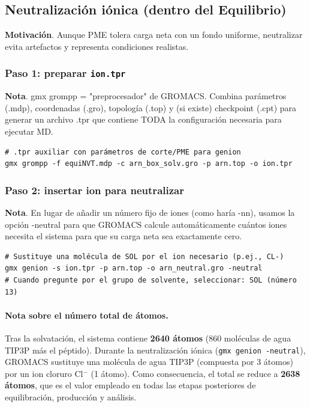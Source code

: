 \documentclass[12pt,a4paper]{article}
\begin{document}
\subsection{Neutralización iónica (dentro del Equilibrio)}
\textbf{Motivación}. Aunque PME tolera carga neta con un fondo uniforme, neutralizar evita artefactos y representa condiciones realistas.

\subsubsection*{Paso 1: preparar \texttt{ion.tpr}}

\noindent\textbf{Nota}. gmx grompp = "preprocesador" de GROMACS. Combina parámetros (.mdp), coordenadas (.gro), topología (.top) y (si existe) checkpoint (.cpt) para generar un archivo .tpr que contiene TODA la configuración necesaria para ejecutar MD.

\begin{lstlisting}[style=bashstyle]
# .tpr auxiliar con parámetros de corte/PME para genion
gmx grompp -f equiNVT.mdp -c arn_box_solv.gro -p arn.top -o ion.tpr
\end{lstlisting}

\subsubsection*{Paso 2: insertar ion para neutralizar}

\noindent\textbf{Nota}. En lugar de añadir un número fijo de iones (como haría -nn), usamos la opción -neutral para que GROMACS calcule automáticamente cuántos iones necesita el sistema para que su carga neta sea exactamente cero.

\begin{lstlisting}[style=bashstyle]
# Sustituye una molécula de SOL por el ion necesario (p.ej., CL-)
gmx genion -s ion.tpr -p arn.top -o arn_neutral.gro -neutral
# Cuando pregunte por el grupo de solvente, seleccionar: SOL (número 13)
\end{lstlisting}

\paragraph*{Nota sobre el número total de átomos.}
Tras la solvatación, el sistema contiene \textbf{2640 átomos} (860 moléculas de
agua TIP3P más el péptido). Durante la neutralización iónica 
(\texttt{gmx genion -neutral}), GROMACS sustituye una molécula de agua TIP3P 
(compuesta por 3 átomos) por un ion cloruro Cl$^{-}$ (1 átomo). 
Como consecuencia, el total se reduce a \textbf{2638 átomos}, que es el valor 
empleado en todas las etapas posteriores de equilibración, producción y análisis.
\end{document}

